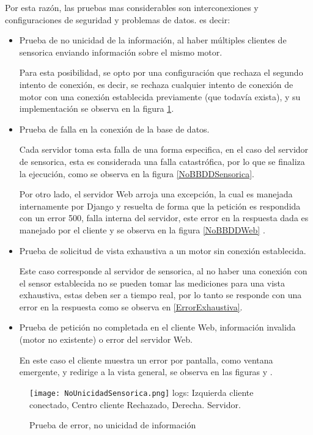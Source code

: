Por esta razón, las pruebas mas considerables son interconexiones y configuraciones
de seguridad y problemas de datos. es decir:

\begin{itemize}
    \item Prueba de no unicidad de la información, al haber múltiples
        clientes de sensorica enviando información sobre el mismo motor.

        Para esta posibilidad, se opto por una configuración que rechaza el
        segundo intento de conexión, es decir, se rechaza cualquier intento de
        conexión de motor con una conexión establecida previamente (que todavía
        exista), y su implementación se observa en la figura \ref{NoUnicidad}.
%
    \item Prueba de falla en la conexión de la base de datos.

        Cada servidor toma esta falla de una forma especifica, en el caso del
        servidor de sensorica, esta es considerada una falla catastrófica, por
        lo que se finaliza la ejecución, como se observa en la figura
        \ref{NoBBDDSensorica}.

        Por otro lado, el servidor Web arroja una excepción, la cual es manejada
        internamente por Django y resuelta de forma que la petición es respondida
        con un error 500, falla interna del servidor, este error en la respuesta
        dada es manejado por el cliente y se observa en la figura
        \ref{NoBBDDWeb} .
%
    \item Prueba de solicitud de vista exhaustiva a un motor sin conexión
        establecida.

        Este caso corresponde al servidor de sensorica, al no haber una conexión
        con el sensor establecida no se pueden tomar las mediciones para una vista
        exhaustiva, estas deben ser a tiempo real, por lo tanto se responde
        con una error en la respuesta como se observa en \ref{ErrorExhaustiva}.
%
    \item Prueba de petición no completada en el cliente Web,
        información invalida (motor no existente) o error del servidor Web.

        En este caso el cliente muestra un error por pantalla, como ventana
        emergente, y redirige a la vista general, se observa en las figuras y  .
\end{itemize}


	\begin{figure}[htb]
		\centering
        \caption{Prueba de error, no unicidad de información}
        \texttt{[image: NoUnicidadSensorica.png]}
        logs: Izquierda cliente conectado, Centro cliente Rechazado, Derecha.
        Servidor.
        \label{NoUnicidad}
	\end{figure}

